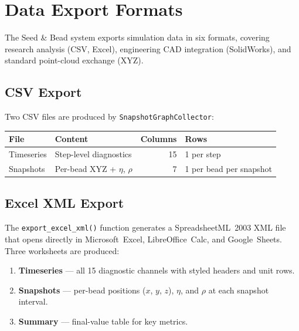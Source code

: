 \documentclass[11pt, a4paper, oneside]{article}
\newcommand{\type}[1]{\texttt{#1}}
\begin{document}
\newpage
\section{Data Export Formats}
\label{sec:export-formats}

The Seed \& Bead system exports simulation data in six formats,
covering research analysis (CSV, Excel), engineering CAD integration
(SolidWorks), and standard point-cloud exchange (XYZ).

\subsection{CSV Export}
\label{sec:csv-export}

Two CSV files are produced by \type{SnapshotGraphCollector}:

\begin{center}
\begin{tabular}{llrl}
  \toprule
  \textbf{File} & \textbf{Content} & \textbf{Columns} & \textbf{Rows} \\
  \midrule
  Timeseries & Step-level diagnostics & 15 & 1 per step \\
  Snapshots  & Per-bead XYZ + $\eta$, $\rho$ & 7 & 1 per bead per snapshot \\
  \bottomrule
\end{tabular}
\end{center}

\subsection{Excel XML Export}
\label{sec:excel-export}

The \type{export\_excel\_xml()} function generates a SpreadsheetML~2003
XML file that opens directly in Microsoft~Excel, LibreOffice~Calc,
and Google~Sheets.  Three worksheets are produced:

\begin{enumerate}
  \item \textbf{Timeseries} --- all 15 diagnostic channels with
        styled headers and unit rows.
  \item \textbf{Snapshots} --- per-bead positions ($x$, $y$, $z$),
        $\eta$, and $\rho$ at each snapshot interval.
  \item \textbf{Summary} --- final-value table for key metrics.
\end{enumerate}
\end{document}
